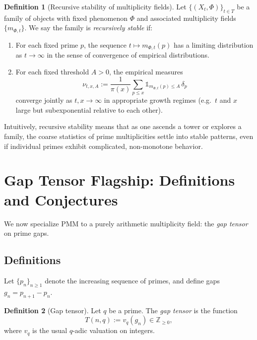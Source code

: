 \documentclass[11pt]{article}
\theoremstyle{definition}
\newtheorem{definition}{Definition}[section]
\theoremstyle{plain}
\theoremstyle{remark}
\newcommand{\ZZ}{\mathbb{Z}}
\newcommand{\1}{\mathbb{1}}
\begin{document}
\begin{definition}[Recursive stability of multiplicity fields]
Let \(\{(X_t,\Phi)\}_{t\in T}\) be a family of objects with fixed phenomenon \(\Phi\) and associated multiplicity fields \(\{m_{\Phi,t}\}\). We say the family is \emph{recursively stable} if:
\begin{enumerate}[label=(\roman*),leftmargin=*]
  \item For each fixed prime \(p\), the sequence \(t\mapsto m_{\Phi,t}(p)\) has a limiting distribution as \(t\to\infty\) in the sense of convergence of empirical distributions.
  \item For each fixed threshold \(A>0\), the empirical measures
  \[
    \nu_{t,x,A} := \frac{1}{\pi(x)}\sum_{p\le x} \1_{m_{\Phi,t}(p)\le A}\,\delta_p
  \]
  converge jointly as \(t,x\to\infty\) in appropriate growth regimes (e.g.\ \(t\) and \(x\) large but subexponential relative to each other).
\end{enumerate}
\end{definition}

Intuitively, recursive stability means that as one ascends a tower or explores a family, the coarse statistics of prime multiplicities settle into stable patterns, even if individual primes exhibit complicated, non-monotone behavior.

\section{Gap Tensor Flagship: Definitions and Conjectures}

We now specialize PMM to a purely arithmetic multiplicity field: the \emph{gap tensor} on prime gaps.

\subsection{Definitions}

Let \(\{p_n\}_{n\ge 1}\) denote the increasing sequence of primes, and define gaps \(g_n = p_{n+1}-p_n\).

\begin{definition}[Gap tensor]
Let \(q\) be a prime. The \emph{gap tensor} is the function
\[
  T(n,q) := v_q(g_n) \in \ZZ_{\ge 0},
\]
where \(v_q\) is the usual \(q\)-adic valuation on integers.
\end{definition}
\end{document}
